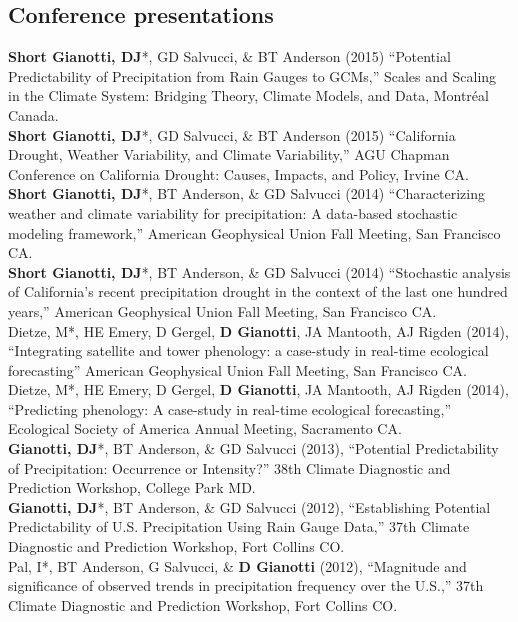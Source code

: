 \documentclass[10pt, a4paper]{article}
\newcommand{\years}[1]{\marginnote{\scriptsize #1}}
\begin{document}
\subsection*{Conference presentations}
\noindent
\years{2015}\textbf{Short Gianotti, DJ}*, GD Salvucci, \& BT Anderson (2015) ``Potential Predictability of Precipitation from Rain Gauges to
GCMs,'' Scales and Scaling in the Climate System: Bridging Theory, Climate Models, and Data, Montr\'{e}al Canada.\\
\years{2015}\textbf{Short Gianotti, DJ}*, GD Salvucci, \& BT Anderson (2015) ``California Drought, Weather Variability, and Climate Variability,'' AGU Chapman Conference on California Drought: Causes, Impacts, and Policy, Irvine CA.\\
\years{2014}\textbf{Short Gianotti, DJ}*, BT Anderson, \& GD Salvucci (2014) ``Characterizing weather and climate variability for precipitation: A data-based stochastic modeling framework,'' American Geophysical Union Fall Meeting, San Francisco CA.\\
\years{2014}\textbf{Short Gianotti, DJ}*, BT Anderson, \& GD Salvucci (2014) ``Stochastic analysis of California's recent precipitation drought in the context of the last one hundred years,'' American Geophysical Union Fall Meeting, San Francisco CA.\\
\years{2014}Dietze, M*, HE Emery, D Gergel, \textbf{D Gianotti}, JA Mantooth, AJ Rigden (2014), ``Integrating satellite and tower phenology: a case-study in real-time ecological forecasting'' American Geophysical Union Fall Meeting, San Francisco CA.\\
\years{2014}Dietze, M*, HE Emery, D Gergel, \textbf{D Gianotti}, JA Mantooth, AJ Rigden (2014), ``Predicting phenology: A case-study in real-time ecological forecasting,'' Ecological Society of America Annual Meeting, Sacramento CA.\\
\years{2013}\textbf{Gianotti, DJ}*, BT Anderson, \& GD Salvucci  (2013), ``Potential Predictability of Precipitation: Occurrence or Intensity?'' 38th Climate Diagnostic and Prediction Workshop, College Park MD.\\
\years{2012}\textbf{Gianotti, DJ}*, BT Anderson, \& GD Salvucci (2012), ``Establishing Potential Predictability of U.S. Precipitation Using Rain Gauge Data,'' 37th Climate Diagnostic and Prediction Workshop, Fort Collins CO.\\
\years{2012}Pal, I*, BT Anderson, G Salvucci, \& \textbf{D Gianotti}  (2012), ``Magnitude and significance of observed trends in precipitation frequency over the U.S.,'' 37th Climate Diagnostic and Prediction Workshop, Fort Collins CO.\\
\end{document}
